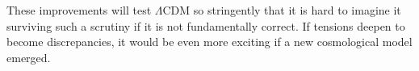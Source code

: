 \documentclass[PICOReport.tex]{subfiles}
\begin{document}
These improvements will test $\Lambda$CDM so stringently that it is hard to imagine it surviving such a scrutiny if it is not fundamentally correct. If tensions deepen to become discrepancies, it would be even more exciting if a new cosmological model emerged. 

\end{document}
